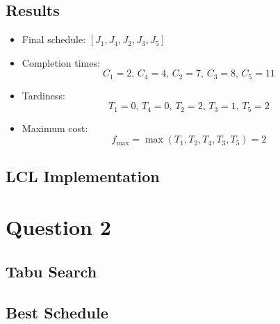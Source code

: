 \documentclass[fleqn]{article}
\begin{document}
    \subsection*{Results}
    \begin{itemize}
        \item Final schedule: $[J_1, J_4, J_2, J_3, J_5]$
        \item Completion times:
        \[
        C_1 = 2, \, C_4 = 4, \, C_2 = 7, \, C_3 = 8, \, C_5 = 11
        \]
        \item Tardiness:
        \[
        T_1 = 0, \, T_4 = 0, \, T_2 = 2, \, T_3 = 1, \, T_5 = 2
        \]
        \item Maximum cost:
        \[
        f_{\text{max}} = \max(T_1, T_2, T_4, T_3, T_5) = 2
        \]
    \end{itemize}


  \subsection{LCL Implementation}

  \section{Question 2}
  \subsection{Tabu Search}

  \subsection{Best Schedule}
\end{document}
